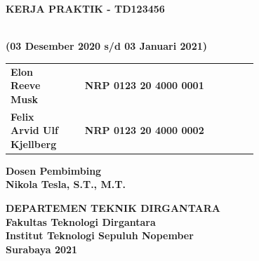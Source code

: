 \begin{flushleft}

  \sffamily

  \noindent\textbf{KERJA PRAKTIK - TD123456}
  \vspace{4ex}

   \\
  \textbf{(03 Desember 2020 s/d 03 Januari 2021)}
  \vspace{6ex}

  \vspace{6ex}

  \begin{adjustwidth}{-2mm}{}
    \begin{tabular}{lcp{0.7\linewidth}}
      \textbf{Elon Reeve Musk} & & \textbf{NRP 0123 20 4000 0001} \\
      \textbf{Felix Arvid Ulf Kjellberg} & & \textbf{NRP 0123 20 4000 0002} \\
    \end{tabular}
  \end{adjustwidth}
  \vspace{4ex}

  \noindent
  \textbf{Dosen Pembimbing} \\
  \textbf{Nikola Tesla, S.T., M.T.}
  \vspace{10ex}

  \noindent\textbf{DEPARTEMEN TEKNIK DIRGANTARA} \\
  \textbf{Fakultas Teknologi Dirgantara} \\
  \textbf{Institut Teknologi Sepuluh Nopember} \\
  \textbf{Surabaya 2021}

\end{flushleft}

\restoregeometry
